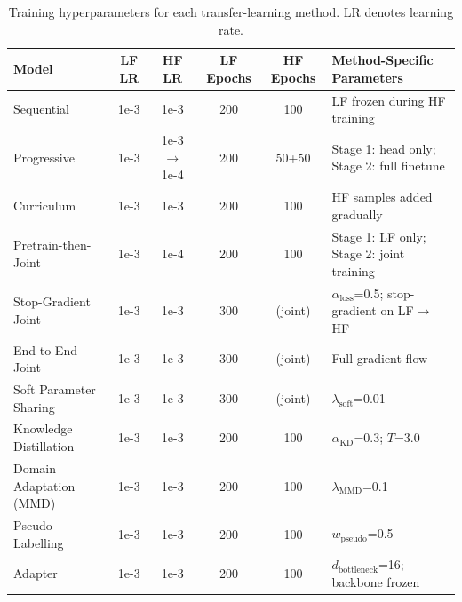 \documentclass[11pt,a4paper]{article}%
\begin{document}
\begin{table}[h]
\centering
\caption{Training hyperparameters for each transfer-learning method. LR denotes learning
rate.}
\label{supptab:model_hyperparams}
{\footnotesize%
\begin{tabular}{lccccl}
\toprule
\textbf{Model} & \textbf{LF LR} & \textbf{HF LR} & \textbf{LF Epochs} & \textbf{HF Epochs} & \textbf{Method-Specific Parameters} \\
\midrule
Sequential & 1e-3 & 1e-3 & 200 & 100 & LF frozen during HF training \\
Progressive & 1e-3 & 1e-3 $\rightarrow$ 1e-4 & 200 & 50+50 & Stage 1: head only; Stage 2: full finetune \\
Curriculum & 1e-3 & 1e-3 & 200 & 100 & HF samples added gradually \\
Pretrain-then-Joint & 1e-3 & 1e-4 & 200 & 100 & Stage 1: LF only; Stage 2: joint training \\
Stop-Gradient Joint & 1e-3 & 1e-3 & 300 & (joint) & $\alpha_{\text{loss}}$=0.5; stop-gradient on LF$\rightarrow$HF \\
End-to-End Joint & 1e-3 & 1e-3 & 300 & (joint) & Full gradient flow \\
Soft Parameter Sharing & 1e-3 & 1e-3 & 300 & (joint) & $\lambda_{\text{soft}}$=0.01 \\
Knowledge Distillation & 1e-3 & 1e-3 & 200 & 100 & $\alpha_{\text{KD}}$=0.3; $T$=3.0 \\
Domain Adaptation (MMD) & 1e-3 & 1e-3 & 200 & 100 & $\lambda_{\text{MMD}}$=0.1 \\
Pseudo-Labelling & 1e-3 & 1e-3 & 200 & 100 & $w_{\text{pseudo}}$=0.5 \\
Adapter & 1e-3 & 1e-3 & 200 & 100 & $d_{\text{bottleneck}}$=16; backbone frozen \\
\bottomrule
\end{tabular}%
}
\end{table}
\end{document}
